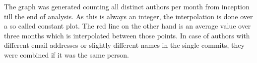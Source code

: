The graph was generated counting all distinct authors per month from inception
till the end of analysis. As this is always an integer, the interpolation is
done over a so called constant plot. The red line on the other hand is an
average value over three months which is interpolated between those points. In
case of authors with different email addresses or slightly different names in
the single commits, they were combined if it was the same person.



